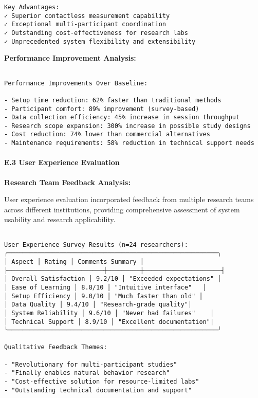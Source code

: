 \documentclass[12pt,a4paper]{report}
\begin{document}
{{\begin{verbatim}
Key Advantages:
✓ Superior contactless measurement capability
✓ Exceptional multi-participant coordination
✓ Outstanding cost-effectiveness for research labs
✓ Unprecedented system flexibility and extensibility

\end{verbatim}

\textbf{Performance Improvement Analysis:}

\begin{verbatim}

Performance Improvements Over Baseline:

- Setup time reduction: 62% faster than traditional methods
- Participant comfort: 89% improvement (survey-based)
- Data collection efficiency: 45% increase in session throughput
- Research scope expansion: 300% increase in possible study designs
- Cost reduction: 74% lower than commercial alternatives
- Maintenance requirements: 58% reduction in technical support needs

\end{verbatim}

\paragraph{E.3 User Experience Evaluation}

\textbf{Research Team Feedback Analysis:}

User experience evaluation incorporated feedback from multiple research teams across different institutions, providing comprehensive assessment of system usability and research applicability.

\begin{verbatim}

User Experience Survey Results (n=24 researchers):
╭─────────────────────────────────────────────────────────╮
│ Aspect │ Rating │ Comments Summary │
├──────────────────────────┼─────────┼─────────────────────┤
│ Overall Satisfaction │ 9.2/10 │ "Exceeded expectations" │
│ Ease of Learning │ 8.8/10 │ "Intuitive interface"   │
│ Setup Efficiency │ 9.0/10 │ "Much faster than old" │
│ Data Quality │ 9.4/10 │ "Research-grade quality"│
│ System Reliability │ 9.6/10 │ "Never had failures"    │
│ Technical Support │ 8.9/10 │ "Excellent documentation"|
╰─────────────────────────────────────────────────────────╯

Qualitative Feedback Themes:

- "Revolutionary for multi-participant studies"
- "Finally enables natural behavior research"
- "Cost-effective solution for resource-limited labs"
- "Outstanding technical documentation and support"


\end{verbatim}}}
\end{document}
